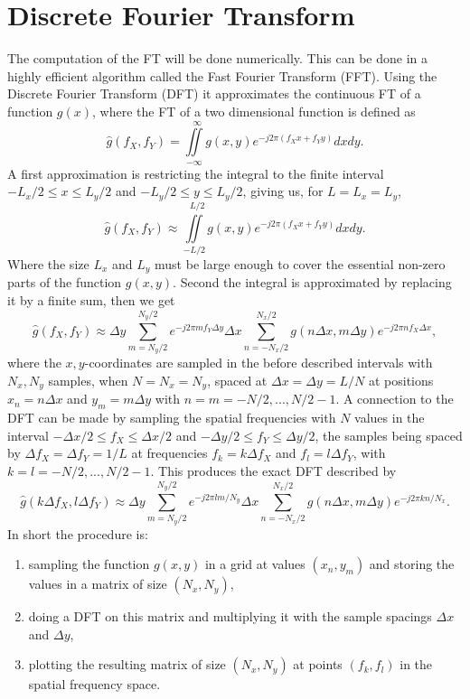 \section{Discrete Fourier Transform}
\label{sec:DFT}
The computation of the FT will be done numerically. This can be done in a highly efficient algorithm called the Fast Fourier Transform (FFT). Using the Discrete Fourier Transform (DFT) it approximates the continuous FT of a function $g(x)$, where the FT of a two dimensional function is defined as
\begin{equation}
\hat{g}(f_X,f_Y)=\iint\limits_{-\infty}^{~~~\infty} g(x,y)e^{-j2\pi(f_Xx + f_Yy)}dxdy.
\end{equation}
A first approximation is restricting the integral to the finite interval $-L_x/2 \leq x \leq L_y/2$ and $-L_y/2 \leq y \leq L_y/2$, giving us, for $L=L_x=L_y$,
\begin{equation}
\hat{g}(f_X,f_Y)\approx\iint\limits_{-L/2}^{~~~L/2} g(x,y)e^{-j2\pi(f_Xx + f_Yy)}dxdy.
\end{equation}
Where the size $L_x$ and $L_y$ must be large enough to cover the essential non-zero parts of the function $g(x,y)$. Second the integral is approximated by replacing it by a finite sum, then we get
\begin{equation}
\hat{g}(f_X,f_Y)\approx  \Delta y \sum\limits_{m=N_y/2}^{N_y/2} e^{-j2\pi mf_Y\Delta y}\Delta x\sum\limits_{n=-N_x/2}^{N_x/2}g(n\Delta x,m\Delta y)e^{-j2\pi nf_X\Delta x },
\end{equation}
where the $x,y$-coordinates are sampled in the before described intervals with $N_x,N_y$ samples, when $N=N_x=N_y$, spaced at $\Delta x=\Delta y = L/N$ at positions $x_n=n\Delta x$ and $y_m=m\Delta y$ with $n=m=-N/2,...,N/2-1$. A connection to the DFT can be made by sampling the spatial frequencies with $N$ values in the interval $-\Delta x/2 \leq f_X \leq \Delta x/2$ and $-\Delta y/2 \leq f_Y \leq \Delta y/2$, the samples being spaced by $\Delta f_X=\Delta f_Y=1/L$ at frequencies $f_k=k\Delta f_X$ and $f_l=l\Delta f_Y$, with $k=l=-N/2,...,N/2-1$. This produces the exact DFT described by
\begin{equation}
\hat{g}(k\Delta f_X,l\Delta f_Y)\approx  \Delta y \sum\limits_{m=N_y/2}^{N_y/2} e^{-j2\pi lm/N_y}\Delta x\sum\limits_{n=-N_x/2}^{N_x/2}g(n\Delta x,m\Delta y)e^{-j2\pi kn/N_x}.
\end{equation}
In short the procedure is:
\begin{enumerate}
	\item sampling the function $g(x,y)$ in a grid at values $(x_n,y_m)$ and storing the values in a matrix of size $(N_x,N_y)$,
	\item doing a DFT on this matrix and multiplying it with the sample spacings $\Delta x$ and $\Delta y$,
	\item plotting the resulting matrix of size $(N_x,N_y)$ at points $(f_k,f_l)$ in the spatial frequency space.
\end{enumerate}
